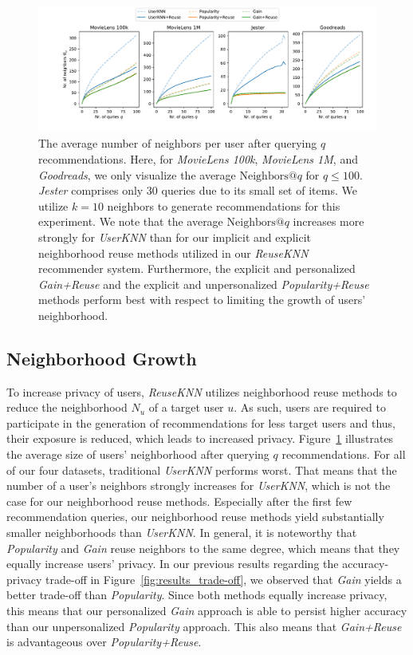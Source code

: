 \documentclass[manuscript,review,anonymous]{acmart}
\begin{document}
\begin{figure}[!t]
    \centering
    \includegraphics[width=\linewidth]{figures/neighborhood.pdf}
    \caption{The average number of neighbors per user after querying $q$ recommendations. Here, for \emph{MovieLens 100k}, \emph{MovieLens 1M}, and \emph{Goodreads}, we only visualize the average $\mathrm{Neighbors}@q$ for $q \leq 100$.
    \emph{Jester} comprises only 30 queries due to its small set of items. 
    We utilize $k=10$ neighbors to generate recommendations for this experiment. 
    We note that the average $\mathrm{Neighbors}@q$ increases more strongly for \emph{UserKNN} than for our implicit and explicit neighborhood reuse methods utilized in our \emph{ReuseKNN} recommender system. Furthermore, the explicit and personalized \emph{Gain+Reuse} and the explicit and unpersonalized \emph{Popularity+Reuse} methods perform best with respect to limiting the growth of users' neighborhood.}
    \label{fig:results_neighborhood}
\end{figure}

\subsection{Neighborhood Growth}
To increase privacy of users, \emph{ReuseKNN} utilizes neighborhood reuse methods to reduce the neighborhood $N_u$ of a target user $u$.
As such, users are required to participate in the generation of recommendations for less target users and thus, their exposure is reduced, which leads to increased privacy.
Figure~\ref{fig:results_neighborhood} illustrates the average size of users' neighborhood after querying $q$ recommendations. 
For all of our four datasets, traditional \emph{UserKNN} performs worst.
That means that the number of a user's neighbors strongly increases for \emph{UserKNN}, which is not the case for our neighborhood reuse methods.
Especially after the first few recommendation queries, our neighborhood reuse methods yield substantially smaller neighborhoods than \emph{UserKNN}.
In general, it is noteworthy that \emph{Popularity} and \emph{Gain} reuse neighbors to the same degree, which means that they equally increase users' privacy.
In our previous results regarding the accuracy-privacy trade-off in Figure~\ref{fig:results_trade-off}, we observed that \emph{Gain} yields a better trade-off than \emph{Popularity}.
Since both methods equally increase privacy, this means that our personalized \emph{Gain} approach is able to persist higher accuracy than our unpersonalized \emph{Popularity} approach.
This also means that \emph{Gain+Reuse} is advantageous over \emph{Popularity+Reuse}.
\end{document}
